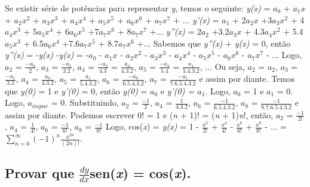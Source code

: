 Se existir série de potências para representar \textit{y}, temos o seguinte:
\newline
\textit{y(x)} = ${a_0}$ + ${a_1}$${x}$ + ${a_2}$${x^2}$ + ${a_3}$${x^3}$ + ${a_4}$${x^4}$ + ${a_5}$${x^5}$ + ${a_6}$${x^6}$ + ${a_7}$${x^7}$ + ...
\newline
\textit{y'(x)} = ${a_1}$ + 2${a_2}$${x}$ +3${a_3}$${x^2}$ + 4${a_4}$${x^3}$ + 5${a_5}$${x^4}$ + 6${a_6}$${x^5}$ +7${a_7}$${x^6}$ + 8${a_7}$${x^7}$ +...
\newline
\textit{y''(x)} = 2${a_2}$ +3.2${a_3}$${x}$ + 4.3${a_4}$${x^2}$ + 5.4${a_5}$${x^3}$ + 6.5${a_6}$${x^4}$ +7.6${a_7}$${x^5}$ + 8.7${a_7}$${x^6}$ +...
\newline
Sabemos que \textit{y''(x)} + \textit{y(x)} = 0, então \textit{y''(x)} = -\textit{y(x)}
\newline
-\textit{y(x)} = -${a_0}$ - ${a_1}$${x}$ - ${a_2}$${x^2}$ - ${a_3}$${x^3}$ - ${a_4}$${x^4}$ - ${a_5}$${x^5}$ - ${a_6}$${x^6}$ - ${a_7}$${x^7}$ - ...
\newline
Logo, ${a_2}$ = $\frac{-{a_0}}{2}$, ${a_3}$ = $\frac{-{a_1}}{3.2}$, ${a_4}$ = $\frac{-{a_2}}{4.3}$ = $\frac{{a_0}}{4.3.2}$, ${a_5}$ = $\frac{-{a_3}}{5.4}$ = $\frac{{a_1}}{5.4.3.2}$, ...
\newline
Ou seja,  ${a_2}$ = ${a_2}$,  ${a_3}$ = $\frac{-{a_1}}{3.2}$,  ${a_4}$ = $\frac{{a_0}}{4.3.2}$,  ${a_5}$ = $\frac{{a_1}}{5.4.3.2}$,  ${a_6}$ = $\frac{-{a_0}}{6.5.4.3.2}$,  ${a_7}$ = $\frac{-{a_1}}{7.6.5.4.3.2}$ e assim por diante.
\newline
Temos que  \textit{y(0)} = 1 e \textit{y'(0)} = 0, então \textit{y(0)} = ${a_0}$ e \textit{y'(0) = ${a_1}$}. Logo, ${a_0}$ = 1 e ${a_1}$ = 0.  Logo, ${a_{impar}}$ = 0.
\newline
Substituindo, ${a_2}$ = $\frac{{-1}}{2}$, ${a_4}$ = $\frac{{1}}{4.3.2}$, ${a_6}$ = $\frac{{-1}}{6.5.4.3.2}$, ${a_8}$ = $\frac{{-1}}{8.7.6.5.4.3.2}$ e assim por diante.
\newline
Podemos escrever 0! = 1 e (\textit{n} + 1)! = (\textit{n} + 1)\textit{n}!, então,  ${a_2}$ = $\frac{{-1}}{2!}$, ${a_4}$ = $\frac{{1}}{4!}$, ${a_6}$ = $\frac{{-1}}{6!}$, ${a_8}$ = $\frac{{-1}}{8!}$
\newline
Logo, cos(\textit{x}) = \textit{y(x)} = 1 - $\frac{x^2}{2!}$ + $\frac{x^4}{4!}$ - $\frac{x^6}{6!}$ + $\frac{x^8}{8!}$ - ... = $\sum_{n=0}^{\infty}$$(-1)^{n}$$\frac{x^{2n}}{(2n)!}$.


\subsection{Provar que $\frac{dy}{dx}$sen(\textit{x}) = cos(\textit{x}).}

